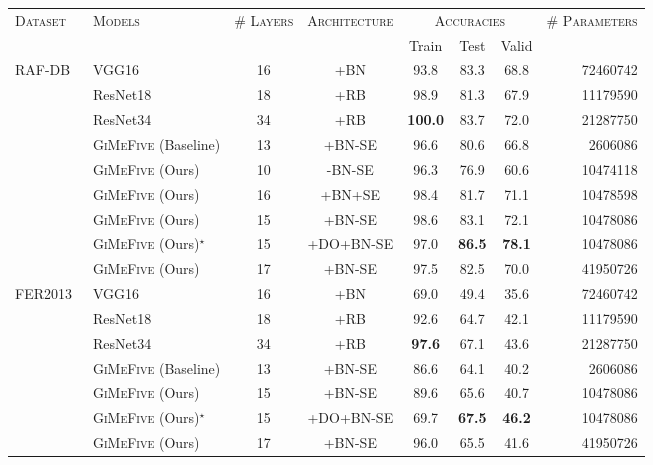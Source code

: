 \begin{table}[ht]
  \centering
  \begin{tabular}{@{}llcccccr@{}}
    \toprule 
    \multirow{2}{*}{\textsc{Dataset}}&\multirow{2}{*}{\textsc{Models}}&\multirow{2}{*}{\textsc{\# Layers}}&\multirow{2}{*}{\textsc{Architecture}} & \multicolumn{3}{c}{\textsc{Accuracies}} & \multirow{2}{*}{\textsc{\# Parameters}} \\
    \cline{5-7}
    &&&& Train & Test & Valid  &  \\
    \midrule
    \multirow{9}{*}{RAF-DB~\cite{li_reliable_2017,li2019reliable}} &VGG16~\cite{SimonyanZ14a} & 16 &+BN&93.8&83.3&68.8&72460742\\ 
    & ResNet18~\cite{HeZRS16} & 18 & +RB  & 98.9 & 81.3 & 67.9 & 11179590 \\
    & ResNet34~\cite{HeZRS16} & 34 & +RB  & \textbf{100.0} & 83.7 & 72.0 & 21287750 \\
    &\textsc{GiMeFive} (Baseline) & 13 & +BN-SE & 96.6 & 80.6 & 66.8 & 2606086 \\ 
    &\textsc{GiMeFive} (Ours) & 10 & -BN-SE & 96.3 & 76.9 & 60.6 & 10474118 \\
    &\textsc{GiMeFive} (Ours) & 16 & +BN+SE & 98.4 & 81.7 & 71.1 & 10478598 \\
    &\textsc{GiMeFive} (Ours) & 15 & +BN-SE & 98.6 & 83.1 & 72.1 & 10478086 \\
    &\textsc{GiMeFive} (Ours)\textcolor{LMUGreen}{$^\star$} & 15 & +DO+BN-SE & 97.0 & \textbf{86.5} & \textbf{78.1} & 10478086 \\
    &\textsc{GiMeFive} (Ours) & 17 & +BN-SE & 97.5 & 82.5 & 70.0 & 41950726 \\ 
    \midrule
    \multirow{7}{*}{FER2013~\cite{BarsoumZCZ16}} & VGG16~\cite{SimonyanZ14a} & 16 & +BN & 69.0 & 49.4 & 35.6 & 72460742 \\
    & ResNet18~\cite{HeZRS16} & 18 & +RB  & 92.6 & 64.7 & 42.1 & 11179590 \\
    & ResNet34~\cite{HeZRS16} & 34 & +RB  & \textbf{97.6} & 67.1 & 43.6 & 21287750 \\
    & \textsc{GiMeFive} (Baseline) & 13 & +BN-SE & 86.6 & 64.1 & 40.2 & 2606086 \\
    &\textsc{GiMeFive} (Ours) & 15 & +BN-SE & 89.6 & 65.6 & 40.7 & 10478086 \\
    &\textsc{GiMeFive} (Ours)\textcolor{LMUGreen}{$^\star$} & 15 & +DO+BN-SE & 69.7 & \textbf{67.5} & \textbf{46.2} & 10478086 \\
    &\textsc{GiMeFive} (Ours) & 17 & +BN-SE & 96.0 & 65.5 & 41.6 & 41950726 \\

\end{tabular}
\end{table}
